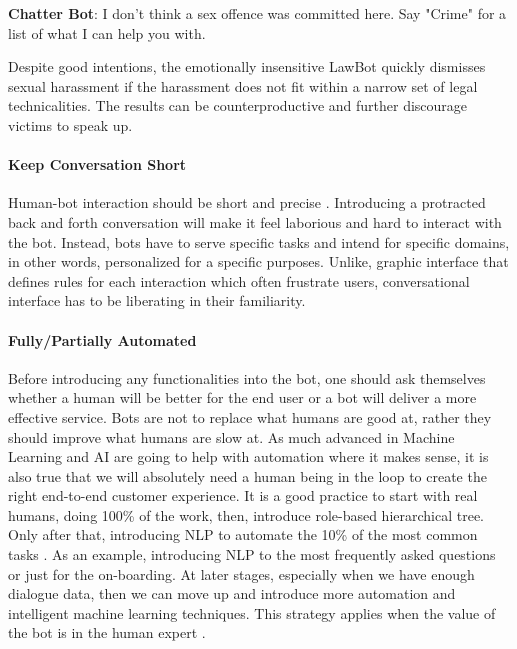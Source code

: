 { \selectfont

  \color{red}
  \textbf{Chatter Bot}:  I don’t think a sex offence was committed here. Say "Crime" for a list of what I can help you with.\\
  
  \color{black}
}

Despite good intentions, the emotionally insensitive LawBot quickly dismisses sexual harassment if the harassment does not fit within a narrow set of legal technicalities. The results can be counterproductive and further discourage victims to speak up.


\paragraph{Keep Conversation Short}
Human-bot interaction should be short and precise \cite{fadhil2018}. Introducing a protracted back and forth conversation will make it feel laborious and hard to interact with the bot. Instead, bots have to serve specific tasks and intend for specific domains, in other words, personalized for a specific purposes. Unlike, graphic interface that defines rules for each interaction which often frustrate users, conversational interface has to be liberating in their familiarity.

\paragraph{Fully/Partially Automated}
Before introducing any functionalities into the bot, one should ask themselves whether a human will be better for the end user or a bot will deliver a more effective service. Bots are not to replace what humans are good at, rather they should improve what humans are slow at. As much advanced in Machine Learning and AI are going to help with automation where it makes sense, it is also true that we will absolutely need a human being in the loop to create the right end-to-end customer experience. It is a good practice to start with real humans, doing 100\% of the work, then, introduce role-based hierarchical tree. Only after that, introducing NLP to automate the 10\% of the most common tasks \cite{fadhil2018}. As an example, introducing NLP to the most frequently asked questions or just for the on-boarding. At later stages, especially when we have enough dialogue data, then we can move up and introduce more automation and intelligent machine learning techniques. This strategy applies when the value of the bot is in the human expert \cite{khan2018}.

